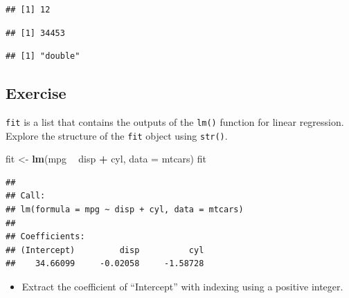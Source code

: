 \documentclass[]{book}
\newenvironment{Shaded}{\begin{snugshade}}{\end{snugshade}}
\newcommand{\CommentTok}[1]{\textcolor[rgb]{0.56,0.35,0.01}{\textit{#1}}}
\newcommand{\DataTypeTok}[1]{\textcolor[rgb]{0.13,0.29,0.53}{#1}}
\newcommand{\KeywordTok}[1]{\textcolor[rgb]{0.13,0.29,0.53}{\textbf{#1}}}
\newcommand{\NormalTok}[1]{#1}
\newcommand{\OperatorTok}[1]{\textcolor[rgb]{0.81,0.36,0.00}{\textbf{#1}}}
\newcommand{\StringTok}[1]{\textcolor[rgb]{0.31,0.60,0.02}{#1}}
\providecommand{\tightlist}{%
  \setlength{\itemsep}{0pt}\setlength{\parskip}{0pt}}
\begin{document}
\begin{verbatim}
## [1] 12
\end{verbatim}

\begin{Shaded}
\end{Shaded}

\begin{verbatim}
## [1] 34453
\end{verbatim}

\begin{Shaded}
\end{Shaded}

\begin{verbatim}
## [1] "double"
\end{verbatim}

\hypertarget{exercise-2}{%
\subsection{Exercise}\label{exercise-2}}

\texttt{fit} is a list that contains the outputs of the \texttt{lm()} function for linear regression. Explore the structure of the \texttt{fit} object using \texttt{str()}.

\begin{Shaded}
\begin{Highlighting}[]
\NormalTok{fit <-}\StringTok{ }\KeywordTok{lm}\NormalTok{(mpg }\OperatorTok{~}\StringTok{ }\NormalTok{disp }\OperatorTok{+}\StringTok{ }\NormalTok{cyl, }\DataTypeTok{data =}\NormalTok{ mtcars)}
\NormalTok{fit}
\end{Highlighting}
\end{Shaded}

\begin{verbatim}
## 
## Call:
## lm(formula = mpg ~ disp + cyl, data = mtcars)
## 
## Coefficients:
## (Intercept)         disp          cyl  
##    34.66099     -0.02058     -1.58728
\end{verbatim}

\begin{itemize}
\tightlist
\item
  Extract the coefficient of ``Intercept'' with indexing using a positive integer.
\end{itemize}
\end{document}
